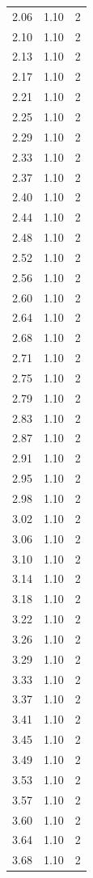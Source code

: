 \begin{longtable}{lrr}
  2.06 & 1.10 & 2 \\
  2.10 & 1.10 & 2 \\
  2.13 & 1.10 & 2 \\
  2.17 & 1.10 & 2 \\
  2.21 & 1.10 & 2 \\
  2.25 & 1.10 & 2 \\
  2.29 & 1.10 & 2 \\
  2.33 & 1.10 & 2 \\
  2.37 & 1.10 & 2 \\
  2.40 & 1.10 & 2 \\
  2.44 & 1.10 & 2 \\
  2.48 & 1.10 & 2 \\
  2.52 & 1.10 & 2 \\
  2.56 & 1.10 & 2 \\
  2.60 & 1.10 & 2 \\
  2.64 & 1.10 & 2 \\
  2.68 & 1.10 & 2 \\
  2.71 & 1.10 & 2 \\
  2.75 & 1.10 & 2 \\
  2.79 & 1.10 & 2 \\
  2.83 & 1.10 & 2 \\
  2.87 & 1.10 & 2 \\
  2.91 & 1.10 & 2 \\
  2.95 & 1.10 & 2 \\
  2.98 & 1.10 & 2 \\
  3.02 & 1.10 & 2 \\
  3.06 & 1.10 & 2 \\
  3.10 & 1.10 & 2 \\
  3.14 & 1.10 & 2 \\
  3.18 & 1.10 & 2 \\
  3.22 & 1.10 & 2 \\
  3.26 & 1.10 & 2 \\
  3.29 & 1.10 & 2 \\
  3.33 & 1.10 & 2 \\
  3.37 & 1.10 & 2 \\
  3.41 & 1.10 & 2 \\
  3.45 & 1.10 & 2 \\
  3.49 & 1.10 & 2 \\
  3.53 & 1.10 & 2 \\
  3.57 & 1.10 & 2 \\
  3.60 & 1.10 & 2 \\
  3.64 & 1.10 & 2 \\
  3.68 & 1.10 & 2 \\

\end{longtable}
